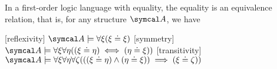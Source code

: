 \begin{proposition}\label{thm:first_order_equality_is_equivalence_relation}
  In a first-order logic language with equality, the equality is an equivalence relation, that is, for any structure \( \Cal{A} \), we have
  \begin{description}
    [reflexivity] \( \Cal{A} \models \forall \xi (\xi \doteq \xi) \)
    [symmetry] \( \Cal{A} \models \forall \xi \forall \eta ((\xi \doteq \eta) \iff (\eta \doteq \xi)) \)
    [transitivity] \( \Cal{A} \models \forall \xi \forall \eta \forall \zeta (((\xi \doteq \eta) \land (\eta \doteq \xi)) \implies (\xi \doteq \zeta)) \)
  \end{description}
\end{proposition}
